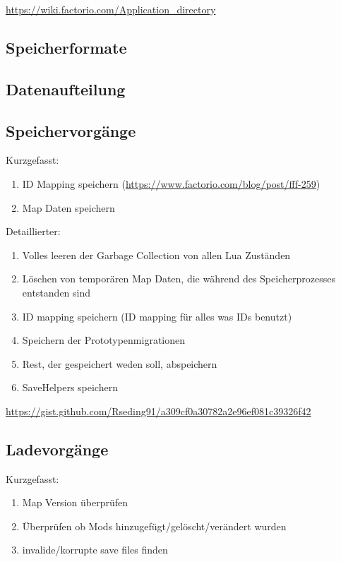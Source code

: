 \url{https://wiki.factorio.com/Application_directory} %

\subsection{Speicherformate}

\subsection{Datenaufteilung}

\subsection{Speichervorgänge}
Kurzgefasst:
\begin{enumerate}
    \item ID Mapping speichern (\url{https://www.factorio.com/blog/post/fff-259}) %
    \item Map Daten speichern
\end{enumerate}

Detaillierter:
\begin{enumerate}
    \item Volles leeren der Garbage Collection von allen Lua Zuständen
    \item Löschen von temporären Map Daten, die während des Speicherprozesses entstanden sind
    \item ID mapping speichern (ID mapping für alles was IDs benutzt)
    \item Speichern der Prototypenmigrationen
    \item Rest, der gespeichert weden soll, abspeichern
    \item SaveHelpers speichern
\end{enumerate}
\url{https://gist.github.com/Rseding91/a309cf0a30782a2e96ef081c39326f42} 

\subsection{Ladevorgänge}
Kurzgefasst:
\begin{enumerate}
    \item Map Version überprüfen
    \item Überprüfen ob Mods hinzugefügt/gelöscht/verändert wurden
    \item invalide/korrupte save files finden 
\end{enumerate}

